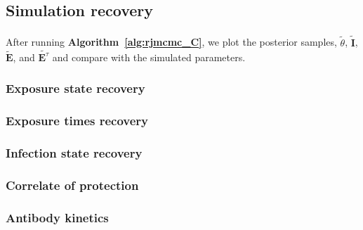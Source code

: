 \documentclass{article}
\begin{document}
\subsection{Simulation recovery }
\paragraph{}After running \textbf{Algorithm~\ref{alg:rjmcmc_C}}, we plot the posterior samples, $\tilde{\theta}$, $\tilde{\mathbf{I}}$,  $\tilde{\mathbf{E}}$, and  $\tilde{\mathbf{E}^\tau}$ and compare with the simulated parameters.

\subsubsection{Exposure state recovery}
\paragraph{}

\subsubsection{Exposure times recovery}
\paragraph{}

\subsubsection{Infection state recovery}
\paragraph{}

\subsubsection{Correlate of protection}
\paragraph{}

\subsubsection{Antibody kinetics}
\paragraph{}
\end{document}
